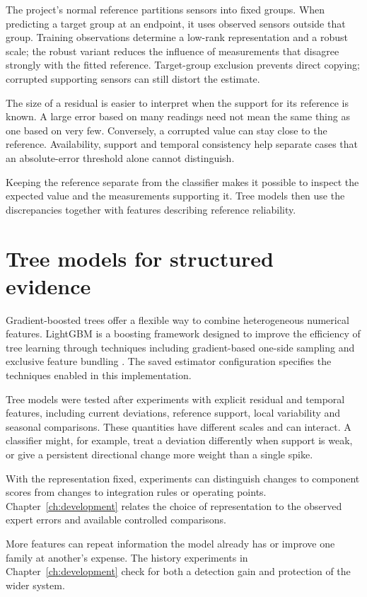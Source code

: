 The project's normal reference partitions sensors into fixed groups. When predicting a target group at an endpoint, it uses observed sensors outside that group. Training observations determine a low-rank representation and a robust scale; the robust variant reduces the influence of measurements that disagree strongly with the fitted reference. Target-group exclusion prevents direct copying; corrupted supporting sensors can still distort the estimate.

The size of a residual is easier to interpret when the support for its reference is known. A large error based on many readings need not mean the same thing as one based on very few. Conversely, a corrupted value can stay close to the reference. Availability, support and temporal consistency help separate cases that an absolute-error threshold alone cannot distinguish.

Keeping the reference separate from the classifier makes it possible to inspect the expected value and the measurements supporting it. Tree models then use the discrepancies together with features describing reference reliability.

\section{Tree models for structured evidence}
Gradient-boosted trees offer a flexible way to combine heterogeneous numerical features. LightGBM is a boosting framework designed to improve the efficiency of tree learning through techniques including gradient-based one-side sampling and exclusive feature bundling \cite{lightgbm}. The saved estimator configuration specifies the techniques enabled in this implementation.

Tree models were tested after experiments with explicit residual and temporal features, including current deviations, reference support, local variability and seasonal comparisons. These quantities have different scales and can interact. A classifier might, for example, treat a deviation differently when support is weak, or give a persistent directional change more weight than a single spike.

With the representation fixed, experiments can distinguish changes to component scores from changes to integration rules or operating points. Chapter~\ref{ch:development} relates the choice of representation to the observed expert errors and available controlled comparisons.

More features can repeat information the model already has or improve one family at another's expense. The history experiments in Chapter~\ref{ch:development} check for both a detection gain and protection of the wider system.

